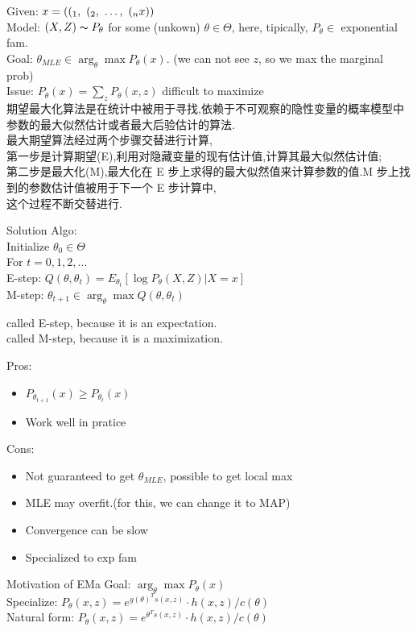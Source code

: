 \documentclass{article}
\begin{document}
\noindent
Given: $x = ((_1,~(_2,~\ldots,~(_nx))$\\
Model: $(X, Z) \thicksim{P}_\theta$ for some (unkown) $\theta \in \Theta$, here, tipically, $P_\theta \in $ exponential fam.\\
Goal: $\theta_{MLE} \in \arg_\theta \max P_\theta(x)$. (we can not see $z$, so we max the marginal prob)\\
Issue: $P_\theta(x) = \sum_z P_\theta(x,z)$ difficult to maximize\\

期望最大化算法是在统计中被用于寻找,依赖于不可观察的隐性变量的概率模型中参数的最大似然估计或者最大后验估计的算法.\\
最大期望算法经过两个步骤交替进行计算,\\
第一步是计算期望(E),利用对隐藏变量的现有估计值,计算其最大似然估计值;\\
第二步是最大化(M),最大化在 E 步上求得的最大似然值来计算参数的值.M 步上找到的参数估计值被用于下一个 E 步计算中,\\
这个过程不断交替进行.

Solution Algo: \\
Initialize $\theta_0 \in \Theta$\\
For $t = 0,1,2, \ldots$\\
\quad E-step: $Q(\theta, \theta_t) = E_{\theta_t}[\log P_\theta(X,Z)|X = x]$ \\
\quad M-step: $\theta_{t+1} \in \arg_\theta \max Q(\theta, \theta_t)$

\noindent
called E-step, because it is an expectation.\\
called M-step, because it is a maximization.

Pros:
\begin{itemize}
\item $P_{\theta_{t+1}}(x) \geq P_{\theta_t}(x)$
\item Work well in pratice
\end{itemize}

Cons:
\begin{itemize}
\item Not guaranteed to get $\theta_{MLE}$, possible to get local max
\item MLE may overfit.(for this, we can change it to MAP)
\item Convergence can be slow
\item Specialized to exp fam
\end{itemize}

Motivation of EMa
\noindent
Goal: $\arg_\theta \max P_\theta(x)$\\
Specialize: $P_\theta(x,z) = e^{g(\theta)^T s(x,z)} \cdot h(x,z) / c(\theta)$\\
Natural form: $P_\theta(x,z) = e^{\theta^T s(x,z)} \cdot h(x,z) / c(\theta)$
\end{document}
